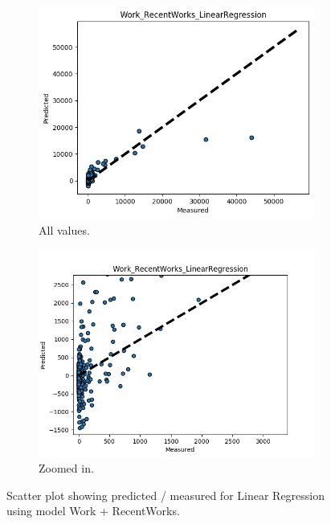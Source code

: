 \begin{figure}
	\centering
	\begin{subfigure}{.5\columnwidth}
		\centering
		\includegraphics[width=\columnwidth]{graphics/Work_RecentWorks_LinearRegression.png}
		\caption{All values.}
		\label{fig:avgFavorites}
	\end{subfigure}%
	\begin{subfigure}{.5\columnwidth}
		\centering
		\includegraphics[width=\columnwidth]{graphics/Work_RecentWorks_LinearRegressionZOOM.png}
		\caption{Zoomed in.}
		\label{fig:avgScores}
	\end{subfigure}
	\caption{Scatter plot showing predicted / measured for Linear Regression using model Work + RecentWorks.}
	\label{fig:scatterPlot_LR_WR}
\end{figure}


